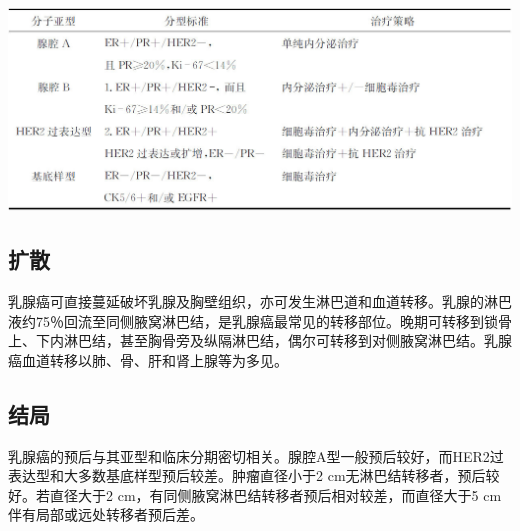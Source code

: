 \begin{table}[ht]
    \caption{乳腺癌分子分型标准及相应治疗原则}
    \label{tab11-3}
    \centering
 \includegraphics{./images/Image00205.jpg}
\end{table}

\subsection{扩散}

乳腺癌可直接蔓延破坏乳腺及胸壁组织，亦可发生淋巴道和血道转移。乳腺的淋巴液约75％回流至同侧腋窝淋巴结，是乳腺癌最常见的转移部位。晚期可转移到锁骨上、下内淋巴结，甚至胸骨旁及纵隔淋巴结，偶尔可转移到对侧腋窝淋巴结。乳腺癌血道转移以肺、骨、肝和肾上腺等为多见。

\subsection{结局}

乳腺癌的预后与其亚型和临床分期密切相关。腺腔A型一般预后较好，而HER2过表达型和大多数基底样型预后较差。肿瘤直径小于2
cm无淋巴结转移者，预后较好。若直径大于2
cm，有同侧腋窝淋巴结转移者预后相对较差，而直径大于5
cm伴有局部或远处转移者预后差。

